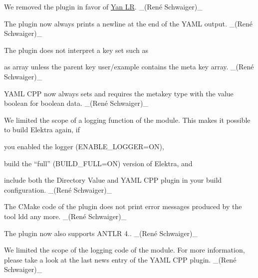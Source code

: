 \begin{DoxyItemize}
\item We removed the plugin in favor of \hyperlink{autotoc_md955_src_plugins_yanlr_README_md}{Yan LR}. \+\_\+(René Schwaiger)\+\_\+
\end{DoxyItemize}


\begin{DoxyItemize}
\item The plugin now always prints a newline at the end of the Y\+A\+ML output. \+\_\+(René Schwaiger)\+\_\+
\item The plugin does not interpret a key set such as
\end{DoxyItemize}




as array unless the parent key {\ttfamily user/example} contains the meta key {\ttfamily array}. \+\_\+(René Schwaiger)\+\_\+


\begin{DoxyItemize}
\item Y\+A\+ML C\+PP now always sets and requires the metakey {\ttfamily type} with the value {\ttfamily boolean} for boolean data. \+\_\+(René Schwaiger)\+\_\+
\item We limited the scope of a logging function of the module. This makes it possible to build Elektra again, if
\begin{DoxyItemize}
\item you enabled the logger ({\ttfamily E\+N\+A\+B\+L\+E\+\_\+\+L\+O\+G\+G\+ER=ON}),
\item build the “full” ({\ttfamily B\+U\+I\+L\+D\+\_\+\+F\+U\+LL=ON}) version of Elektra, and
\item include both the Directory Value and Y\+A\+ML C\+PP plugin in your build configuration. \+\_\+(René Schwaiger)\+\_\+
\end{DoxyItemize}
\end{DoxyItemize}


\begin{DoxyItemize}
\item The C\+Make code of the plugin does not print error messages produced by the tool {\ttfamily ldd} any more. \+\_\+(René Schwaiger)\+\_\+
\item The plugin now also supports A\+N\+T\+LR 4.. \+\_\+(René Schwaiger)\+\_\+
\item We limited the scope of the logging code of the module. For more information, please take a look at the last news entry of the Y\+A\+ML C\+PP plugin. \+\_\+(René Schwaiger)\+\_\+
\end{DoxyItemize}


